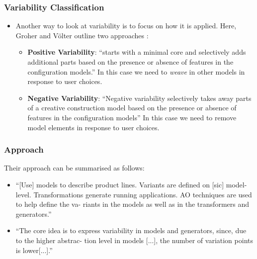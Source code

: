 \documentclass{beamer}
\begin{document}
\begin{frame}
\frametitle{Variability Classification}

\begin{itemize}
\item Another way to look at variability is to focus on how it is
  applied. Here, Groher and V{\"o}lter outline two approaches
  \cite{groher2007expressing}:

  \pause

  \begin{itemize}

  \item \textbf{Positive Variability}: ``starts with a minimal core
    and selectively adds additional parts based on the presence or
    absence of features in the configuration models.'' In this case we
    need to \emph{weave} in other models in response to user choices.

  \pause

  \item \textbf{Negative Variability}: ``Negative variability
    selectively takes away parts of a creative construction model
    based on the presence or absence of features in the configuration
    models'' In this case we need to remove model elements in response
    to user choices.

  \end{itemize}

\end{itemize}

\end{frame}

\begin{frame}
\frametitle{Approach}

Their approach can be summarised as follows:

\begin{itemize}

\item ``[Use] models to describe product lines. Variants are defined
  on [sic] model-level.  Transformations generate running
  applications. \acf{AO} techniques are used to help define the va-
  riants in the models as well as in the transformers and
  generators.''\cite{voelter2007handling}

  \pause

\item ``The core idea is to express variability in models and
  generators, since, due to the higher abstrac- tion level in models
  [...], the number of variation points is
  lower[...].''\cite{voelter2007handling}

  \pause





\end{itemize}

\end{frame}
\end{document}

